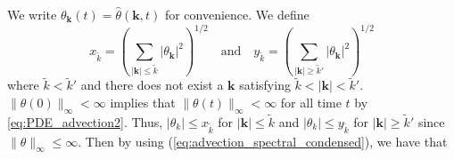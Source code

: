 \documentclass[12pt]{article}
\begin{document}
 We write $\theta_{\mathbf{k}}(t)=\hat{\theta}(\mathbf{k},t)$ for convenience. We define
\begin{equation}
x_{\tilde{k}}=\left(\sum_{|\mathbf{k}|\leq\tilde{k}}|\theta_{\mathbf{k}}|^{2}\right)^{1/2} \quad \text{and} \quad  
y_{\tilde{k}}=\left(\sum_{|\mathbf{k}|\geq\tilde{k}'}|\theta_{\mathbf{k}}|^{2}\right)^{1/2} 
\end{equation}
where $\tilde{k}<\tilde{k}'$ and there does not exist a $\mathbf{k}$ satisfying $\tilde{k}<|\mathbf{k}|<\tilde{k}'$.
$\|\theta(0)\|_{\infty}<\infty$ implies that $\|\theta(t)\|_{\infty}<\infty$ for all time $t$ by \ref{eq:PDE_advection2}. Thus, $|\theta_{k}|\leq x_{\tilde{k}} $ for $|\mathbf{k}|\leq\tilde{k}$ and $|\theta_{k}|\leq y_{\tilde{k}} $ for $|\mathbf{k}|\geq\tilde{k}'$ since $\|\theta\|_{\infty}\leq \infty$. Then by using (\ref{eq:advection_spectral_condensed}), we have that
\end{document}

